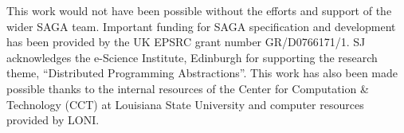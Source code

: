 \documentclass{llncs}
\begin{document}
\up\upp

This work would not have been possible without the efforts and support
of the wider SAGA team. Important funding for SAGA specification and
development has been provided by the UK EPSRC grant number
GR/D0766171/1.  SJ acknowledges the e-Science Institute, Edinburgh for
supporting the research theme, ``Distributed Programming
Abstractions''.  This work has also been made possible thanks to the
internal resources of the Center for Computation \& Technology (CCT)
at Louisiana State University and computer resources provided by LONI.

\up\upp



\end{document}
